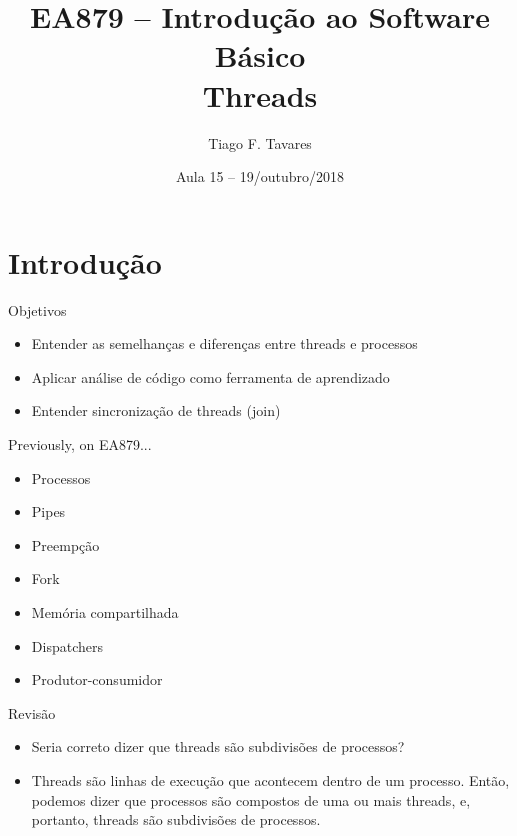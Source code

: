 \documentclass{beamer}
\title[15-threads]{EA879 -- Introdução ao Software
Básico\\Threads}
\author{Tiago F. Tavares}
\institute{FEEC -- UNICAMP}
\date{Aula 15 -- 19/outubro/2018}
\begin{document}
\begin{frame}
  \titlepage
\end{frame}


\section{Introdução}

\begin{frame}{Objetivos}
  \Large
  \begin{itemize}
    \item Entender as semelhanças e diferenças entre threads e processos
    \item Aplicar análise de código como ferramenta de aprendizado
    \item Entender sincronização de threads (join)
  \end{itemize}
\end{frame}

\begin{frame}[fragile]{Previously, on EA879...}
  \centering
  \Large
  \begin{itemize}
  \item Processos
  \item Pipes
  \item Preempção
  \item Fork
  \item Memória compartilhada
  \item Dispatchers
  \item Produtor-consumidor
  \end{itemize}
\end{frame}

\begin{frame}[fragile]{Revisão}
  \centering
  \Large
  \begin{itemize}
    \item Seria correto dizer que threads são subdivisões de processos?

    \item <2-> Threads são linhas de execução que acontecem dentro de um processo. Então,
podemos dizer que processos são compostos de uma ou mais threads, e, portanto,
  threads são subdivisões de processos.
  \end{itemize}
\end{frame}
\end{document}
